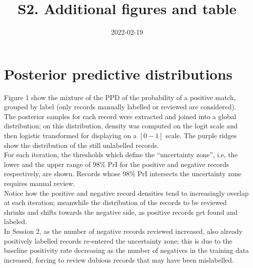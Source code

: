 \documentclass[
]{article}
\title{S2. Additional figures and table}
\author{}
\date{\vspace{-2.5em}2022-02-19}
\begin{document}
\maketitle

{
\setcounter{tocdepth}{2}
\tableofcontents
}
\newpage

\hypertarget{posterior-predictive-distributions}{%
\section{Posterior predictive
distributions}\label{posterior-predictive-distributions}}

Figure 1 show the mixture of the PPD of the probability of a positive
match, grouped by label (only records manually labelled or reviewed are
considered). The posterior samples for each record were extracted and
joined into a global distribution; on this distribution, density was
computed on the logit scale and then logistic transformed for displaying
on a \([0 - 1]\) scale. The purple ridges show the distribution of the
still unlabelled records.\\
For each iteration, the thresholds which define the ``uncertainty
zone'', i.e, the lower and the upper range of 98\% PrI for the positive
and negative records respectively, are shown. Records whose 98\% PrI
intersects the uncertainty zone requires manual review.\\
Notice how the positive and negative record densities tend to
increasingly overlap at each iteration; meanwhile the distribution of
the records to be reviewed shrinks and shifts towards the negative side,
as positive records get found and labeled.\\
In Session 2, as the number of negative records reviewed increased, also
already positively labelled records re-entered the uncertainty zone;
this is due to the baseline positivity rate decreasing as the number of
negatives in the training data increased, forcing to review dubious
records that may have been mislabelled.
\end{document}
